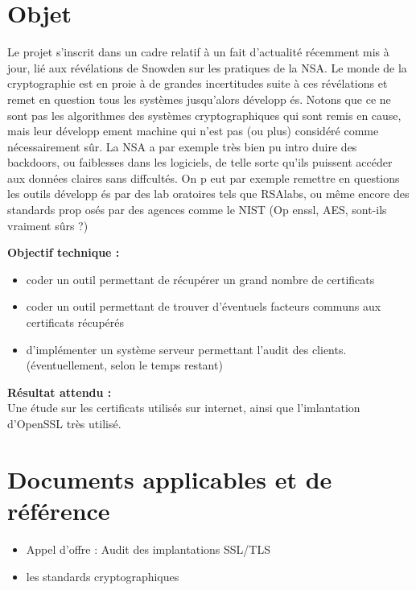 \documentclass[a4paper,11pt,french]{article}
\begin{document}
\section{Objet}
Le projet s'inscrit dans un cadre relatif à un fait d'actualité récemment mis à jour, lié aux révélations de Snowden sur les pratiques de la NSA. Le monde de la cryptographie est en proie à de grandes incertitudes suite à ces révélations et remet en question tous les systèmes jusqu'alors développ és. Notons que ce ne sont pas les algorithmes des systèmes cryptographiques qui sont remis en cause, mais leur développ ement machine qui n'est pas (ou plus) considéré comme nécessairement sûr. La NSA a par exemple très bien pu intro duire des backdoors, ou faiblesses dans les logiciels, de telle sorte qu'ils puissent accéder aux données claires sans diffcultés. On p eut par exemple remettre en questions les outils développ és par des lab oratoires tels que RSAlabs, ou même encore des standards prop osés par des agences comme le NIST (Op enssl, AES, sont-ils vraiment sûrs ?)

\textbf{Objectif technique : }\\
\begin{itemize}
	\item coder un outil permettant de récupérer un grand nombre de certificats
	\item coder un outil permettant de trouver d'éventuels facteurs communs aux certificats récupérés
	\item  d'implémenter un système serveur permettant l'audit des clients. (éventuellement, selon le temps restant)
\end{itemize}

\textbf{Résultat attendu : }\\
Une étude sur les certificats utilisés sur internet, ainsi que l'imlantation d'OpenSSL très utilisé.

\section{Documents applicables et de référence}
\begin{itemize}
	\item Appel d'offre : Audit des implantations SSL/TLS
	\item les standards cryptographiques
\end{itemize}

\end{document}
